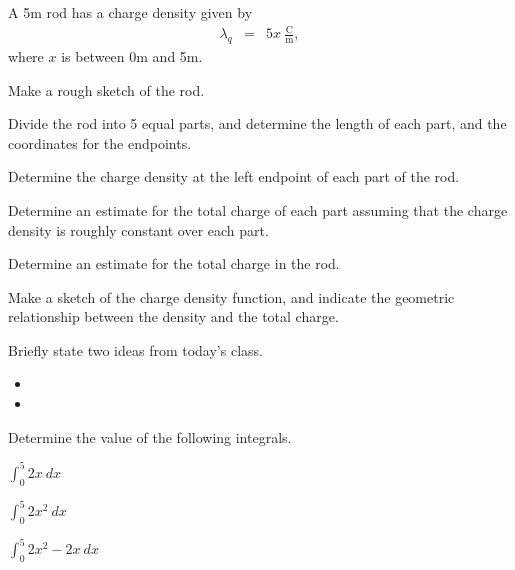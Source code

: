 \begin{problem}
\item A 5m rod has a charge density given by
  \begin{eqnarray*}
    \lambda_q & = & 5x~\frac{\mathrm{C}}{\mathrm{m}},
  \end{eqnarray*}
  where $x$ is between 0m and 5m.
  \begin{subproblem}
  \item Make a rough sketch of the rod.
    \vspace{4em}
  \item Divide the rod into 5 equal parts, and determine the length of
    each part, and the coordinates for the endpoints.
    \vfill
  \item Determine the charge density at the left endpoint of each part
    of the rod.
    \vfill
    \clearpage
  \item Determine an estimate for the total charge of each part
    assuming that the charge density is roughly constant over each
    part.
    \vfill
    \vfill
  \item Determine an estimate for the total charge in the rod.
    \vfill
    \vfill
  \item Make a sketch of the charge density function, and indicate the geometric relationship between the density and the total charge.
      \vfill
  \end{subproblem}
\end{problem}

\postClass

\begin{problem}
\item Briefly state two ideas from today's class.
  \begin{itemize}
  \item
  \item
  \end{itemize}
\item
  \begin{subproblem}
    \item
  \end{subproblem}
\end{problem}




\begin{problem}
  \item Determine the value of the following integrals.
    \begin{subproblem}
    \item $\int^5_0 2x ~ dx$
      \vfill
    \item $\int^5_0 2x^2 ~ dx$
      \vfill
    \item $\int^5_0 2x^2 - 2x ~ dx$
      \vfill
    \end{subproblem}
\end{problem}


